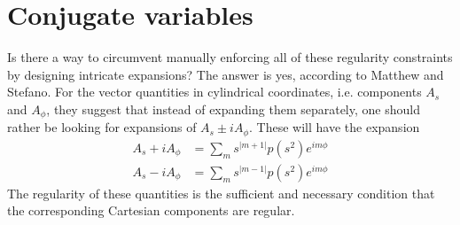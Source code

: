 \section{Conjugate variables}


Is there a way to circumvent manually enforcing all of these regularity constraints by designing intricate expansions?
The answer is yes, according to Matthew and Stefano.
For the vector quantities in cylindrical coordinates, i.e. components $A_s$ and $A_\phi$, they suggest that instead of expanding them separately, one should rather be looking for expansions of $A_s \pm i A_\phi$. These will have the expansion
\begin{equation}\label{eqn:lin-combo-vector}
    \begin{aligned}
    A_s + iA_\phi &= \sum_m s^{|m+1|} p(s^2) e^{im\phi} \\ 
    A_s - iA_\phi &= \sum_m s^{|m-1|} p(s^2) e^{im\phi}
\end{aligned}
\end{equation}
The regularity of these quantities is the sufficient and necessary condition that the corresponding Cartesian components are regular.

